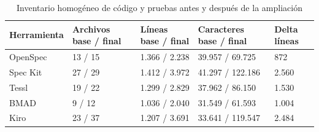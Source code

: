 \begin{table}[H]\centering\small\setlength{\tabcolsep}{4pt}\renewcommand{\arraystretch}{1.06}
\caption{Inventario homogéneo de código y pruebas antes y después de la ampliación}
\label{tab:codigo_tetris_e2}
\begin{tabularx}{\textwidth}{l Y Y Y Y}\toprule

\textbf{Herramienta} & \textbf{Archivos base / final} & \textbf{Líneas base / final} & \textbf{Caracteres base / final} & \textbf{Delta líneas} \\ \midrule

OpenSpec & 13 / 15 & 1.366 / 2.238 & 39.957 / 69.725 & 872 \\

Spec Kit & 27 / 29 & 1.412 / 3.972 & 41.297 / 122.186 & 2.560 \\

Tessl & 19 / 22 & 1.299 / 2.829 & 37.962 / 86.150 & 1.530 \\

BMAD & 9 / 12 & 1.036 / 2.040 & 31.549 / 61.593 & 1.004 \\

Kiro & 23 / 37 & 1.207 / 3.691 & 33.641 / 119.547 & 2.484 \\

\bottomrule\end{tabularx}

\end{table}

